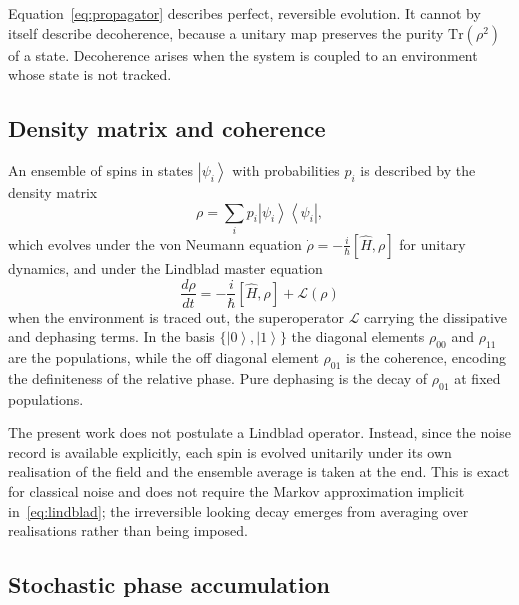 \documentclass[10pt,twocolumn,a4paper]{article}
\newcommand{\ket}[1]{\left|#1\right\rangle}
\newcommand{\bra}[1]{\left\langle#1\right|}
\begin{document}
Equation~\eqref{eq:propagator} describes perfect, reversible evolution. It cannot
by itself describe decoherence, because a unitary map preserves the purity
$\mathrm{Tr}(\rho^2)$ of a state. Decoherence arises when the system is coupled to
an environment whose state is not tracked.

\subsection{Density matrix and coherence}

An ensemble of spins in states $\ket{\psi_i}$ with probabilities $p_i$ is
described by the density matrix
\begin{equation}
\rho = \sum_i p_i \ket{\psi_i}\bra{\psi_i},
\end{equation}
which evolves under the von Neumann equation
$\dot{\rho} = -\tfrac{i}{\hbar}[\hat{H},\rho]$ for unitary dynamics, and under the
Lindblad master equation
\begin{equation}
\frac{d\rho}{dt} = -\frac{i}{\hbar}\left[\hat{H},\rho\right] + \mathcal{L}(\rho)
\label{eq:lindblad}
\end{equation}
when the environment is traced out, the superoperator $\mathcal{L}$ carrying the
dissipative and dephasing terms. In the basis $\{\ket{0},\ket{1}\}$ the diagonal
elements $\rho_{00}$ and $\rho_{11}$ are the populations, while the off diagonal
element $\rho_{01}$ is the coherence, encoding the definiteness of the relative
phase. Pure dephasing is the decay of $\rho_{01}$ at fixed populations.

The present work does not postulate a Lindblad operator. Instead, since the noise
record is available explicitly, each spin is evolved unitarily under its own
realisation of the field and the ensemble average is taken at the end. This is
exact for classical noise and does not require the Markov approximation implicit
in~\eqref{eq:lindblad}; the irreversible looking decay emerges from averaging over
realisations rather than being imposed.

\subsection{Stochastic phase accumulation}
\end{document}
